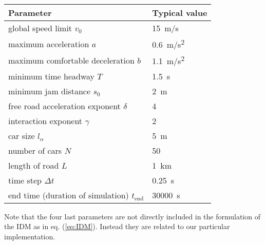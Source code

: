 \begin{center}

\begin{tabular}[pos]{p{} p{}}
    \toprule
    Parameter & Typical value\\
    \midrule
    global speed limit $v_0$ & \SI{15}{m/s} \\
    maximum acceleration $a$ & \SI{0.6}{m/s^2} \\
    maximum comfortable deceleration $b$ & \SI{1.1}{m/s^2} \\
    minimum time headway $T$ & \SI{1.5}{s} \\
    minimum jam distance $s_0$ & \SI{2}{m} \\
    free road acceleration exponent $\delta$ & 4 \\
    interaction exponent $\gamma$ & 2\\
    car size $l_\alpha$ & \SI{5}{m} \\
    number of cars $N$ & 50\\
    length of road $L$ & \SI{1}{km} \\
    time step $\Delta t$ & \SI{0.25}{s} \\
    end time (duration of simulation) $t_\mathrm{end}$ &  \SI{30000}{s}\\
    \bottomrule
\end{tabular}
\end{center}

Note that the four last parameters are not directly included in the formulation of the IDM as in eq. (\ref{eq:IDM}). Instead they are related to our particular implementation.
